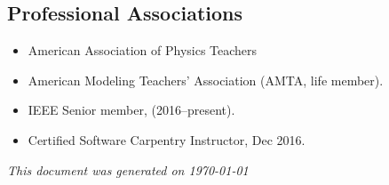 \documentclass[margin,line,letterpaper]{res}
\begin{document}
\begin{resume}




\section{\bf Professional Associations}
\begin{itemize}
\item American Association of Physics Teachers 
\item American Modeling Teachers' Association (AMTA, life member).
\item IEEE Senior member, (2016--present).
\item Certified Software Carpentry Instructor, Dec 2016.
\end{itemize}

\textit{This document was generated on \today}
\end{resume}
\end{document}
